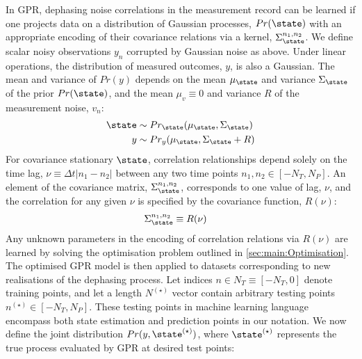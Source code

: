 In GPR, dephasing noise correlations in the measurement record can be learned if one projects data on a distribution of Gaussian processes, $Pr(\state)$ with an appropriate encoding of their covariance relations via a kernel, $\Sigma_\state^{n_1, n_2}$. We define scalar noisy observations $y_{n}$ corrupted by Gaussian noise as above.  %
Under linear operations, the distribution of measured outcomes, $y$, is also a Gaussian. The  mean and variance of $Pr(y)$  depends on the mean $\mu_\state$ and variance $\Sigma_\state$ of the prior $Pr(\state)$, and the mean $\mu_v \equiv 0$ and variance $R$ of the measurement noise, $v_n$: 
\begin{align}
\state & \sim Pr_\state(\mu_\state,\Sigma_\state ) \\
y & \sim Pr_y(\mu_\state,\Sigma_\state + R ) 
\end{align}
For covariance stationary $\state$, correlation relationships depend solely on the time lag, $\nu \equiv \Delta t|n_1 - n_2|$ between any two time points  $n_1, n_2 \in [-N_T, N_P]$.  An element of the covariance matrix, $\Sigma_\state^{n_1,n_2}$, corresponds to one value of lag, $\nu$, and the correlation for any given $\nu$  is specified by the covariance function, $R(\nu)$:
\begin{align}
\Sigma_\state^{n_1,n_2} & \equiv R(\nu) 
\end{align}
Any unknown parameters in the encoding of correlation relations via $R(\nu)$ are learned by solving the optimisation problem outlined in \cref{sec:main:Optimisation}. The optimised GPR model is then applied to datasets corresponding to new realisations of the dephasing process. Let indices $n \in N_T \equiv [-N_T, 0]$ denote training points, and let a length $N^{(\star)} $ vector contain arbitrary testing points $n^{(\star)} \in [-N_T, N_P]$. These testing points in machine learning language encompass both state estimation and prediction points in our notation. We now define the joint distribution $Pr(y,\state^{(\star)})$, where $\state^{(\star)}$ represents the true process evaluated by GPR at desired test points: 
